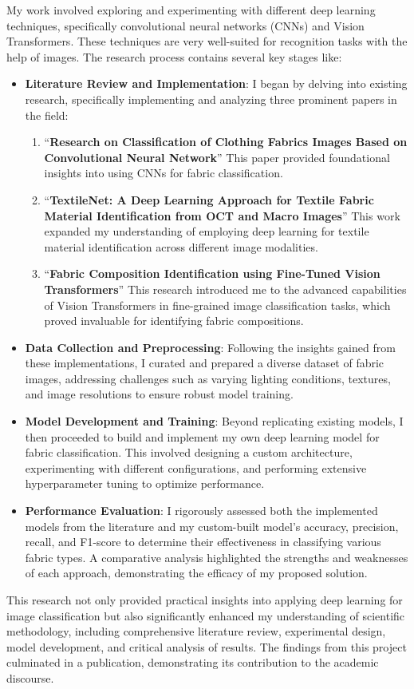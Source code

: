 My work involved exploring and experimenting with different deep learning techniques, specifically convolutional neural networks (CNNs) and Vision Transformers. These techniques are very well-suited for recognition tasks with the help of images. The research process contains several key stages like:
\begin{itemize}
    \item \textbf{Literature Review and Implementation}: I began by delving into existing research, specifically implementing and analyzing three prominent papers in the field:
    \begin{enumerate}
        \item ``\textbf{Research on Classification of Clothing Fabrics Images Based on Convolutional Neural Network}'' This paper provided foundational insights into using CNNs for fabric classification.
        \item ``\textbf{TextileNet: A Deep Learning Approach for Textile Fabric Material Identification from OCT and Macro Images}'' This work expanded my understanding of employing deep learning for textile material identification across different image modalities.
        \item ``\textbf{Fabric Composition Identification using Fine-Tuned Vision Transformers}'' This research introduced me to the advanced capabilities of Vision Transformers in fine-grained image classification tasks, which proved invaluable for identifying fabric compositions.
    \end{enumerate}
    \item \textbf{Data Collection and Preprocessing}: Following the insights gained from these implementations, I curated and prepared a diverse dataset of fabric images, addressing challenges such as varying lighting conditions, textures, and image resolutions to ensure robust model training.
    \item \textbf{Model Development and Training}: Beyond replicating existing models, I then proceeded to build and implement my own deep learning model for fabric classification. This involved designing a custom architecture, experimenting with different configurations, and performing extensive hyperparameter tuning to optimize performance.
    \item \textbf{Performance Evaluation}: I rigorously assessed both the implemented models from the literature and my custom-built model's accuracy, precision, recall, and F1-score to determine their effectiveness in classifying various fabric types. A comparative analysis highlighted the strengths and weaknesses of each approach, demonstrating the efficacy of my proposed solution.
\end{itemize}
This research not only provided practical insights into applying deep learning for image classification but also significantly enhanced my understanding of scientific methodology, including comprehensive literature review, experimental design, model development, and critical analysis of results. The findings from this project culminated in a publication, demonstrating its contribution to the academic discourse.

